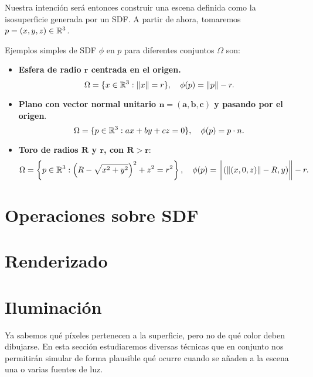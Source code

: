 Nuestra intención será entonces construir una escena definida como la isosuperficie generada por un SDF. A partir de ahora, tomaremos $p=(x,y,z)\in\mathbb{R}^3$.

\begin{ejemplo}
    Ejemplos simples de SDF $\phi$ en $p$ para diferentes conjuntos $\Omega$ son:
    \begin{itemize}
        \item \textbf{Esfera de radio $\boldsymbol{r}$ centrada en el origen.}
        \begin{equation*}
            \Omega=\{x\in \mathbb{R}^3 : \Vert x\Vert = r\},\quad \phi(p) = \Vert p\Vert - r.
        \end{equation*}
        \item \textbf{Plano con vector normal unitario $\boldsymbol{n=(a,b,c)}$ y pasando por el origen}.
        \begin{equation*}
            \Omega=\{p\in\mathbb{R}^3 : ax+by+cz = 0\},\quad \phi(p) = p\cdot n.
        \end{equation*}
        \item \textbf{Toro de radios $\boldsymbol{R}$ y $\boldsymbol{r}$, con $\boldsymbol{R>r}$}:
        \begin{equation*}
            \Omega=\left\{p\in \mathbb{R}^3 : \left(R-\sqrt{x^2+y^2}\right)^2 + z^2 = r^2\right\},\quad \phi(p)= \bigg\Vert (\Vert(x,0,z)\Vert - R, y) \bigg\Vert - r.
        \end{equation*}
    \end{itemize}
\end{ejemplo}

\section{Operaciones sobre SDF}\label{sec:operaciones}


\section{Renderizado}


\section{Iluminación}
Ya sabemos qué píxeles pertenecen a la superficie, pero no de qué color deben dibujarse. En esta sección estudiaremos diversas técnicas que en conjunto nos permitirán simular de forma plausible qué ocurre cuando se añaden a la escena una o varias fuentes de luz.





